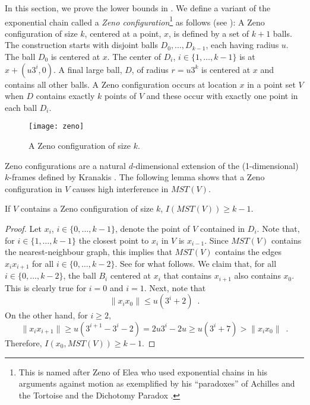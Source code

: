 \documentclass{patmorin}
\newcommand{\mst}{\mathit{MST}}
\begin{document}
In this section, we prove the lower bounds in .
We define a variant of the exponential chain called a \emph{Zeno
configuration}\footnote{This is named after Zeno of Elea who used
exponential chains in his arguments against motion as exemplified
by his ``paradoxes'' of Achilles and the Tortoise and the Dichotomy Paradox
\cite{aristotle:physics}.}
as follows (see ): A Zeno configuration of
size $k$, centered at a point, $x$, is defined by a set of $k+1$ balls.
The construction starts with disjoint balls $D_0,\ldots,D_{k-1}$, each
having radius $u$.  The ball $D_0$ is centered at $x$.  The center of
$D_i$, $i\in\{1,\ldots,k-1\}$ is at $x+(u3^i, 0)$.  A final large ball,
$D$, of radius $r=u3^k$ is centered at $x$ and contains all other balls.
A Zeno configuration occurs at location $x$ in a point set $V$ when $D$
contains exactly $k$ points of $V$ and these occur with exactly one
point in each ball $D_i$.

\begin{figure*}
  \begin{center}
    \texttt{[image: zeno]}
  \end{center}
  \caption{A Zeno configuration of size $k$.}
\end{figure*}

Zeno configurations are a natural $d$-dimensional extension of the
(1-dimensional) $k$-frames defined by Kranakis \etal \cite{kkmns10}.
The following lemma shows that a Zeno configuration in $V$ causes high
interference in $\mst(V)$.

\begin{lem}
If $V$ contains a Zeno configuration of size $k$, $I(\mst(V))\ge k-1$.
\end{lem}

\begin{proof}
Let $x_i$, $i\in\{0,\ldots,k-1\}$, denote the point of $V$ contained in
$D_i$.  Note that, for $i\in\{1,\ldots,k-1\}$ the closest point to $x_i$
in $V$ is $x_{i-1}$.  Since $\mst(V)$ contains the nearest-neighbour
graph, this implies that $\mst(V)$ contains the edges $x_ix_{i+1}$ for
all $i\in\{0,\ldots,k-2\}$.  See  for what follows.
We claim that, for all $i\in\{0,\ldots,k-2\}$, the ball $B_i$ centered
at $x_i$ that contains $x_{i+1}$ also contains $x_0$.  This is clearly
true for $i=0$ and $i=1$.  Next, note that
\[
  \|x_ix_0\| \le u(3^i+2) \enspace .
\]
On the other hand, for $i\ge 2$,
\[
  \|x_ix_{i+1}\| \ge u(3^{i+1}-3^i-2) = 2u3^i-2u \ge u(3^i + 7) > 
\|x_ix_0\| \enspace .
\]
Therefore, $I(x_0,\mst(V)) \ge k-1$.
\end{proof}
\end{document}

